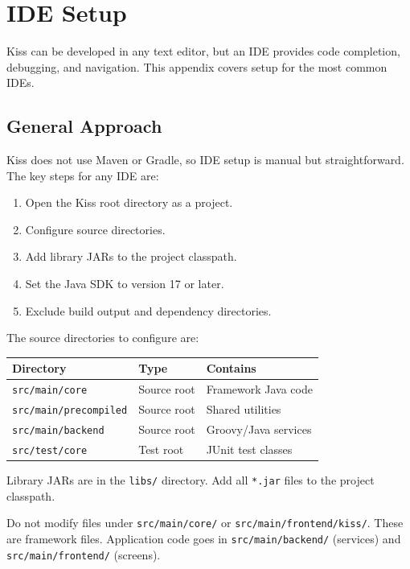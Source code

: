 \chapter{IDE Setup}
\label{ch:ide-setup}

Kiss can be developed in any text editor, but an IDE provides code completion, debugging, and navigation.  This appendix covers setup for the most common IDEs.

\section{General Approach}
\label{sec:ide-general}

Kiss does not use Maven or Gradle, so IDE setup is manual but straightforward.  The key steps for any IDE are:

\begin{enumerate}
  \item Open the Kiss root directory as a project.
  \item Configure source directories.
  \item Add library JARs to the project classpath.
  \item Set the Java SDK to version 17 or later.
  \item Exclude build output and dependency directories.
\end{enumerate}

\noindent
The source directories to configure are:

\begin{longtable}{P{4.4cm}P{2.2cm}P{3.4cm}}
\toprule
\textbf{Directory} & \textbf{Type} & \textbf{Contains} \\
\midrule
\endhead
\texttt{src/main/core} & Source root & Framework Java code \\
\texttt{src/main/precompiled} & Source root & Shared utilities \\
\texttt{src/main/backend} & Source root & Groovy/Java services \\
\texttt{src/test/core} & Test root & JUnit test classes \\
\bottomrule
\end{longtable}

\noindent
Library JARs are in the \texttt{libs/} directory.  Add all \texttt{*.jar} files to the project classpath.

\begin{warnbox}
Do not modify files under \texttt{src/main/core/} or \texttt{src/main/frontend/kiss/}.  These are framework files.  Application code goes in \texttt{src/main/backend/} (services) and \texttt{src/main/frontend/} (screens).
\end{warnbox}

